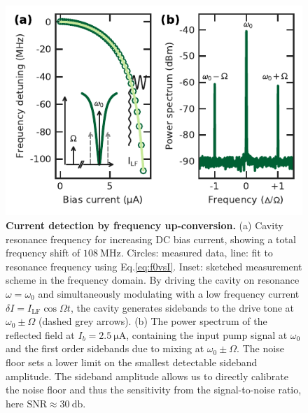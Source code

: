 \begin{figure}
	\centering
	\includegraphics[width=.5\linewidth]{chapter-currentdetection/figures/Figure2}
	\caption{
		\textbf{Current detection by frequency up-conversion.}
		(a) Cavity resonance frequency for increasing DC bias current, showing a total frequency shift of $\SI{108}{\mega\hertz}$.
		Circles: measured data, line: fit to resonance frequency using Eq.\eqref{eq:f0vsI}.
		Inset: sketched measurement scheme in the frequency domain.
		By driving the cavity on resonance $\omega = \omega_0$ and simultaneously modulating with a low frequency current $\delta I = I_\text{LF}\cos\Omega t$, the cavity generates sidebands to the drive tone at $\omega_0 \pm \Omega$ (dashed grey arrows).
		(b) The power spectrum of the reflected field at $I_b=\SI{2.5}{\micro\ampere}$, containing the input pump signal at $\omega_0$ and the first order sidebands due to mixing at $\omega_0 \pm \Omega$.
		The noise floor sets a lower limit on the smallest detectable sideband amplitude.
		The sideband amplitude allows us to directly calibrate the noise floor and thus the sensitivity from the signal-to-noise ratio, here $\text{SNR}\approx\SI{30}{\decibel}$.
		\label{fig:figure2}
	}
\end{figure}

